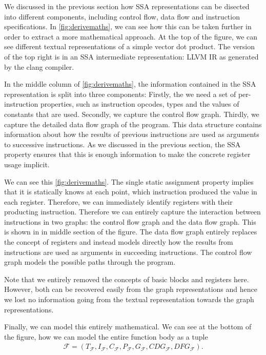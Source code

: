     We discussed in the previous section how SSA representations can be disected
    into different components, including control flow, data flow and instruction
    specifications.
    In \autoref{fig:derivemaths}, we can see how this can be taken further in
    order to extract a more mathematical approach.
    At the top of the figure, we can see different textual representations of a
    simple vector dot product.
    The version of the top right is in an SSA intermediate representation: LLVM
    IR as generated by the clang compiler.

    In the middle column of \autoref{fig:derivemaths}, the information
    contained in the SSA representation is split into three components:
    Firstly, the we need a set of per-instruction properties, such as
    instruction opcodes, types and the values of constants that are used.
    Secondly, we capture the control flow graph.
    Thirdly, we capture the detailed data flow graph of the program.
    This data structure contains information about how the results of previous
    instructions are used as arguments to successive instructions.
    As we discussed in the previous section, the SSA property ensures that this
    is enough information to make the concrete register usage implicit.

    We can see this \autoref{fig:derivemaths}.
    The single static assignment property implies that it is statically knows
    at each point, which instruction produced the value in each register.
    Therefore, we can immediately identify registers with their producting
    instruction.
    Therefore we can entirely capture the interaction between instructions in
    two graphs: the control flow graph and the data flow graph.
    This is shown in in middle section of the figure.
    The data flow graph entirely replaces the concept of registers and instead
    models directly how the results from instructions are used as arguments
    in succeeding instructions.
    The control flow graph models the possible paths through the program.

    Note that we entirely removed the concepts of basic blocks and registers
    here.
    However, both can be recovered easily from the graph representations and
    hence we lost no information going from the textual representation towards
    the graph representations.

    Finally, we can model this entirely mathematical.
    We can see at the bottom of the figure, how we can model the entire function
    body as a tuple
    \begin{align*}
        \mathcal{F}=(T_\mathcal{F},I_\mathcal{F},C_\mathcal{F},P_\mathcal{F},G_\mathcal{F},CDG_\mathcal{F},DFG_\mathcal{F})\text{.}
    \end{align*}

